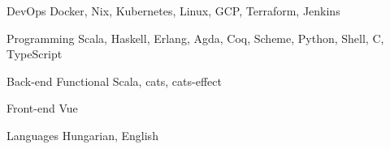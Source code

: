 

\begin{cvskills}

  \cvskill
    {DevOps} %
    {Docker, Nix, Kubernetes, Linux, GCP, Terraform, Jenkins} %

  \cvskill
    {Programming} %
    {Scala, Haskell, Erlang, Agda, Coq, Scheme, Python, Shell, C, TypeScript} %

  \cvskill
    {Back-end} %
    {Functional Scala, cats, cats-effect} %

  \cvskill
    {Front-end} %
    {Vue} %

  \cvskill
    {Languages} %
    {Hungarian, English} %

\end{cvskills}
